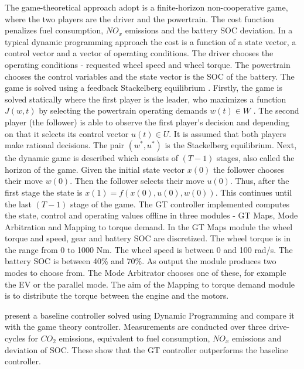 The game-theoretical approach \citet{dextreit2014game} adopt is a finite-horizon non-cooperative game, where the two players are the driver and the powertrain. The cost function penalizes fuel consumption, $NO_x$ emissions and the battery SOC deviation. In a typical dynamic programming approach the cost is a function of a state vector, a control vector and a vector of operating conditions. The driver chooses the operating conditions - requested wheel speed and wheel torque. The powertrain chooses the control variables and the state vector is the SOC of the battery. The game is solved using a feedback Stackelberg equilibrium \citep{von1952theory}. Firstly, the game is solved statically where the first player is the leader, who maximizes a function $J(w,t)$ by selecting the powertrain operating demands $w(t) \in W$ . The second player (the follower) is able to observe the first player's decision and depending on that it selects its control vector $u(t) \in U$. It is assumed that both players make rational decisions. The pair $(w^*, u^*)$ is the Stackelberg equilibrium.
Next, the dynamic game is described which consists of $(T-1)$ stages, also called the horizon of the game. Given the initial state vector $x(0)$ the follower chooses their move $w(0)$. Then the follower selects their move $u(0)$. Thus, after the first stage the state is $x(1) = f(x(0),u(0),w(0))$. This continues until the last $(T-1)$ stage of the game.
The GT controller \citet{dextreit2014game} implemented computes the state, control and operating values offline in three modules - GT Maps, Mode Arbitration and Mapping to torque demand. In the GT Maps module the wheel torque and speed, gear and battery SOC are discretized. The wheel torque is in the range from 0 to 1000 Nm. The wheel speed is between 0 and 100 rad/s. The battery SOC is between 40\% and 70\%. As output the module produces two modes to choose from. The Mode Arbitrator chooses one of these, for example the EV or the parallel mode. The aim of the Mapping to torque demand module is to distribute the torque between the engine and the motors.

\citet{dextreit2014game} present a baseline controller solved using Dynamic Programming and compare it with the game theory controller. Measurements are conducted over three drive-cycles for $CO_2$ emissions, equivalent to fuel consumption, $NO_x$ emissions and deviation of SOC. These show that the GT controller outperforms the baseline controller.

